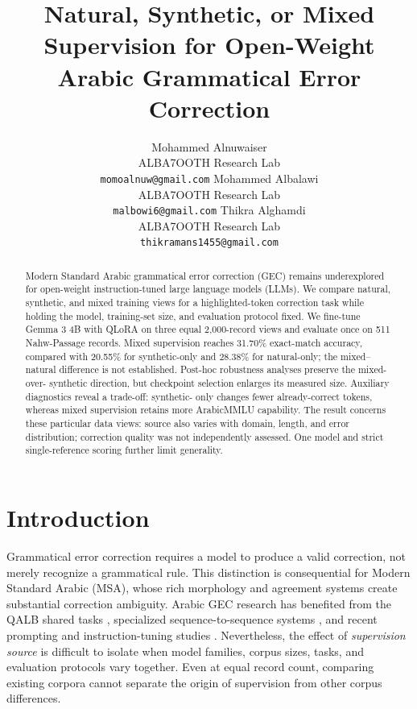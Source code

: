 \documentclass[11pt,a4paper]{article}
\title{Natural, Synthetic, or Mixed Supervision for Open-Weight Arabic
Grammatical Error Correction}
\author{Mohammed Alnuwaiser \\
ALBA7OOTH Research Lab \\
\texttt{momoalnuw@gmail.com}
\And
Mohammed Albalawi \\
ALBA7OOTH Research Lab \\
\texttt{malbowi6@gmail.com}
\And
Thikra Alghamdi \\
ALBA7OOTH Research Lab \\
\texttt{thikramans1455@gmail.com}}
\begin{document}
\maketitle

\begin{abstract}
Modern Standard Arabic grammatical error correction (GEC) remains
underexplored for open-weight instruction-tuned large language models (LLMs).
We compare natural, synthetic, and mixed training views for a
highlighted-token correction task while holding the model, training-set size,
and evaluation protocol fixed.  We fine-tune Gemma 3 4B with QLoRA on three
equal 2,000-record views and evaluate once on 511 Nahw-Passage records.  Mixed
supervision reaches 31.70\% exact-match accuracy, compared with 20.55\% for
synthetic-only and 28.38\% for natural-only; the mixed--natural difference is
not established.  Post-hoc robustness analyses preserve the mixed-over-
synthetic direction, but checkpoint selection enlarges its measured size.
Auxiliary diagnostics reveal a trade-off: synthetic-
only changes fewer already-correct tokens, whereas mixed supervision retains
more ArabicMMLU capability.  The result concerns these particular data views:
source also varies with domain, length, and error distribution; correction
quality was not independently assessed.  One model and strict single-reference
scoring further limit generality.
\end{abstract}

\section{Introduction}

Grammatical error correction requires a model to produce a valid correction,
not merely recognize a grammatical rule.  This distinction is consequential
for Modern Standard Arabic (MSA), whose rich morphology and agreement systems
create substantial correction ambiguity.  Arabic GEC research has benefited
from the QALB shared tasks \citep{mohit-etal-2014-first,
rozovskaya-etal-2015-second}, specialized sequence-to-sequence systems
\citep{nagoudi-etal-2022-arat5,alhafni-etal-2023-advancements}, and recent
prompting and instruction-tuning studies \citep{kwon-etal-2023-beyond}.
Nevertheless, the effect of \emph{supervision source} is difficult to isolate
when model families, corpus sizes, tasks, and evaluation protocols vary
together.  Even at equal record count, comparing existing corpora cannot
separate the origin of supervision from other corpus differences.
\end{document}

